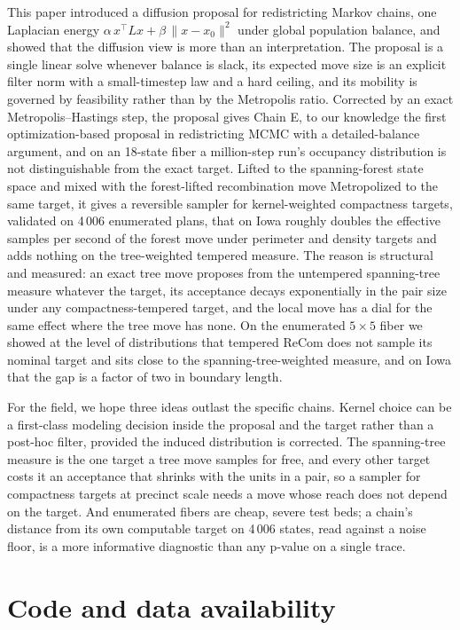 \documentclass[11pt]{article}
\begin{document}
This paper introduced a diffusion proposal for redistricting Markov
chains, one Laplacian energy
$\alpha\,x^\top L x + \beta\,\|x - x_0\|^2$ under global population
balance, and showed that the diffusion view is more than an
interpretation. The proposal is a single linear solve whenever
balance is slack, its expected move size is an explicit filter norm
with a small-timestep law and a hard ceiling, and its mobility is
governed by feasibility rather than by the Metropolis ratio.
Corrected by an exact Metropolis--Hastings step, the proposal gives
Chain E, to our knowledge the first optimization-based proposal in
redistricting MCMC with a detailed-balance argument, and on an
18-state fiber a million-step run's occupancy distribution is not
distinguishable from the exact target. Lifted to the spanning-forest
state space and mixed with the forest-lifted recombination move
Metropolized to the same target, it gives a reversible sampler for
kernel-weighted compactness targets, validated on 4\,006 enumerated
plans, that on Iowa roughly doubles the effective samples per second
of the forest move under perimeter and density targets and adds
nothing on the tree-weighted tempered measure. The reason is
structural and measured: an exact tree move proposes from the
untempered spanning-tree measure whatever the target, its acceptance
decays exponentially in the pair size under any compactness-tempered
target, and the local move has a dial for the same effect where the
tree move has none. On the enumerated $5 \times 5$ fiber we showed at
the level of distributions that tempered ReCom does not sample its
nominal target and sits close to the spanning-tree-weighted measure,
and on Iowa that the gap is a factor of two in boundary length.

For the field, we hope three ideas outlast the specific chains. Kernel
choice can be a first-class modeling decision inside the proposal and
the target rather than a post-hoc filter, provided the induced
distribution is corrected. The spanning-tree measure is the one
target a tree move samples for free, and every other target costs it
an acceptance that shrinks with the units in a pair, so a sampler for
compactness targets at precinct scale needs a move whose reach does
not depend on the target. And enumerated fibers are cheap, severe
test beds; a chain's distance from its own computable target on
4\,006 states, read against a noise floor, is a more informative
diagnostic than any p-value on a single trace.

\section*{Code and data availability}
\end{document}
